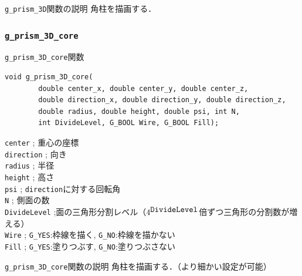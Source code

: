 \documentclass[platex,a4paper,12pt]{jsarticle}%
\begin{document}
\begin{itembox}[l]{\texttt{g\_prism\_3D}関数の説明}
角柱を描画する．
\end{itembox}





\clearpage
\subsubsection{\texttt{g\_prism\_3D\_core}}

\begin{itembox}[l]{\texttt{g\_prism\_3D\_core}関数}
\begin{verbatim}
void g_prism_3D_core(
        double center_x, double center_y, double center_z,
        double direction_x, double direction_y, double direction_z,
        double radius, double height, double psi, int N,
        int DivideLevel, G_BOOL Wire, G_BOOL Fill);   
\end{verbatim}
\verb|center| ; 重心の座標\\
\verb|direction| ; 向き\\
\verb|radius| ; 半径\\
\verb|height| ; 高さ\\
\verb|psi| ; \verb|direction|に対する回転角\\
\verb|N| ; 側面の数\\
\verb|DivideLevel| ;面の三角形分割レベル（$4^{\verb|DivideLevel|}$倍ずつ三角形の分割数が増える）\\
\verb|Wire| ; \verb|G_YES|:枠線を描く, \verb|G_NO|:枠線を描かない \\
\verb|Fill| ; \verb|G_YES|:塗りつぶす, \verb|G_NO|:塗りつぶさない
\end{itembox}

\begin{itembox}[l]{\texttt{g\_prism\_3D\_core}関数の説明}
角柱を描画する．（より細かい設定が可能）
\end{itembox}
\end{document}
